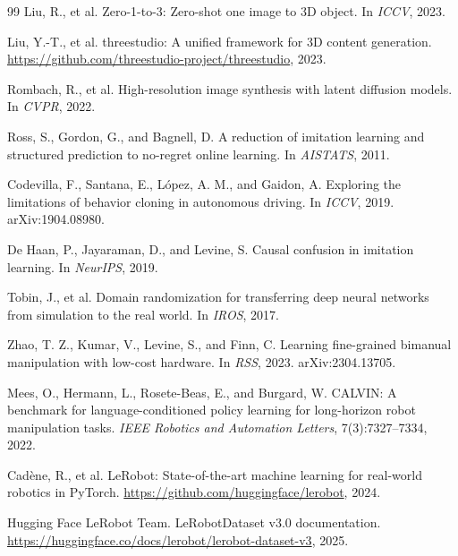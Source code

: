\documentclass[10pt,twocolumn,letterpaper]{article}
\begin{document}
{\begin{thebibliography}{99}
Liu, R., et al.
\newblock Zero-1-to-3: Zero-shot one image to 3D object.
\newblock In \emph{ICCV}, 2023.

Liu, Y.-T., et al.
\newblock threestudio: A unified framework for 3D content generation.
\newblock \url{https://github.com/threestudio-project/threestudio}, 2023.

Rombach, R., et al.
\newblock High-resolution image synthesis with latent diffusion models.
\newblock In \emph{CVPR}, 2022.

Ross, S., Gordon, G., and Bagnell, D.
\newblock A reduction of imitation learning and structured prediction to no-regret online learning.
\newblock In \emph{AISTATS}, 2011.

Codevilla, F., Santana, E., L\'opez, A. M., and Gaidon, A.
\newblock Exploring the limitations of behavior cloning in autonomous driving.
\newblock In \emph{ICCV}, 2019. arXiv:1904.08980.

De Haan, P., Jayaraman, D., and Levine, S.
\newblock Causal confusion in imitation learning.
\newblock In \emph{NeurIPS}, 2019.

Tobin, J., et al.
\newblock Domain randomization for transferring deep neural networks from simulation to the real world.
\newblock In \emph{IROS}, 2017.

Zhao, T. Z., Kumar, V., Levine, S., and Finn, C.
\newblock Learning fine-grained bimanual manipulation with low-cost hardware.
\newblock In \emph{RSS}, 2023. arXiv:2304.13705.

Mees, O., Hermann, L., Rosete-Beas, E., and Burgard, W.
\newblock CALVIN: A benchmark for language-conditioned policy learning for long-horizon robot manipulation tasks.
\newblock \emph{IEEE Robotics and Automation Letters}, 7(3):7327--7334, 2022.

Cad\`ene, R., et al.
\newblock LeRobot: State-of-the-art machine learning for real-world robotics in PyTorch.
\newblock \url{https://github.com/huggingface/lerobot}, 2024.

Hugging Face LeRobot Team.
\newblock LeRobotDataset v3.0 documentation.
\newblock \url{https://huggingface.co/docs/lerobot/lerobot-dataset-v3}, 2025.

\end{thebibliography}
}
\end{document}
